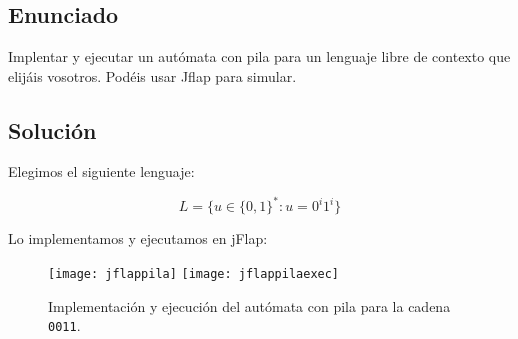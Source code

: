 \chapter{}

\section{Enunciado}

Implentar y ejecutar un autómata con pila para un lenguaje libre de contexto que elijáis vosotros.
Podéis usar Jflap para simular.

\section{Solución}

Elegimos el siguiente lenguaje:

\[L = \Big\{u \in {\{0,1\}}^* : u = 0^{i}1^{i}\Big\}\]

Lo implementamos y ejecutamos en jFlap:

\begin{figure}[h!]
\begin{center}
	\texttt{[image: jflappila]}
	\texttt{[image: jflappilaexec]}
\caption{Implementación y ejecución del autómata con pila para la cadena \texttt{0011}.}
\end{center}
\end{figure}
